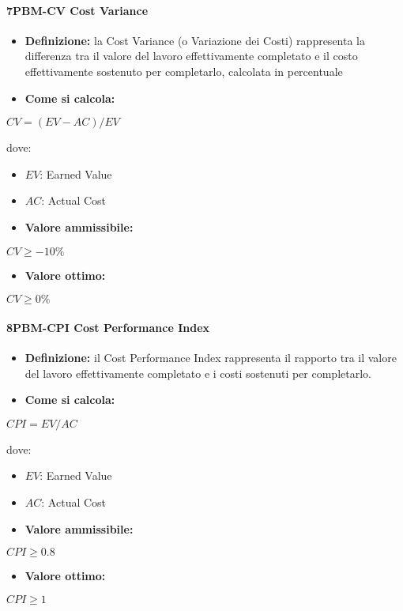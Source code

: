 \paragraph*{7PBM-CV Cost Variance}
\begin{itemize}
    \item \textbf{Definizione:} la Cost Variance (o Variazione dei Costi) rappresenta la differenza tra il valore del lavoro effettivamente completato e il costo effettivamente sostenuto per completarlo, calcolata in percentuale
    \item \textbf{Come si calcola:}
\end{itemize}
\begin{center}
   $CV = (EV - AC)/EV$ 
\end{center}
dove:
\begin{itemize}[label=$\rightarrow$]
    \item $EV$: Earned Value
    \item $AC$: Actual Cost
\end{itemize}
\begin{itemize}
    \item \textbf{Valore ammissibile:}
\end{itemize}
\begin{center}
    $CV \geq -10\%$
\end{center}
\begin{itemize}
    \item \textbf{Valore ottimo:}
\end{itemize}
\begin{center}
    $CV \geq 0\%$
\end{center}

\paragraph*{8PBM-CPI Cost Performance Index}
\begin{itemize}
    \item \textbf{Definizione:} il Cost Performance Index rappresenta il rapporto tra il valore del lavoro effettivamente completato e i costi sostenuti per completarlo.
    \item \textbf{Come si calcola:}
\end{itemize}
\begin{center}
   $CPI = EV/AC$ 
\end{center}
dove:
\begin{itemize}[label=$\rightarrow$]
    \item $EV$: Earned Value
    \item $AC$: Actual Cost
\end{itemize}
\begin{itemize}
    \item \textbf{Valore ammissibile:}
\end{itemize}
\begin{center}
    $CPI \geq 0.8$
\end{center}
\begin{itemize}
    \item \textbf{Valore ottimo:}
\end{itemize}
\begin{center}
    $CPI \geq 1$
\end{center}

